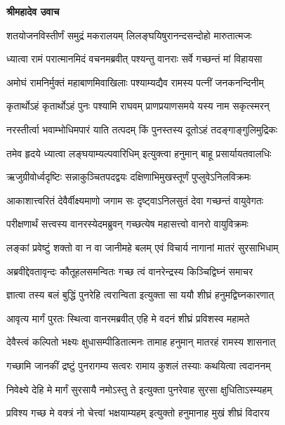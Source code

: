 




\textbf{श्रीमहादेव उवाच}

\twolineshloka
{शतयोजनविस्तीर्णं समुद्रं मकरालयम्}
{लिलङ्घयिषुरानन्दसन्दोहो मारुतात्मजः} %

\twolineshloka
{ध्यात्वा रामं परात्मानमिदं वचनमब्रवीत्}
{पश्यन्तु वानराः सर्वे गच्छन्तं मां विहायसा} %

\twolineshloka
{अमोघं रामनिर्मुक्तं महाबाणमिवाखिलाः}
{पश्याम्यद्यैव रामस्य पत्नीं जनकनन्दिनीम्} %

\twolineshloka
{कृतार्थोऽहं कृतार्थोऽहं पुनः पश्यामि राघवम्}
{प्राणप्रयाणसमये यस्य नाम सकृत्स्मरन्} %

\twolineshloka
{नरस्तीर्त्वा भवाम्भोधिमपारं याति तत्पदम्}
{किं पुनस्तस्य दूतोऽहं तदङ्गाङ्गुलिमुद्रिकः} %

\twolineshloka
{तमेव हृदये ध्यात्वा लङ्घयाम्यल्पवारिधिम्}
{इत्युक्त्वा हनुमान् बाहू प्रसार्यायतवालधिः} %

\twolineshloka
{ऋजुग्रीवोर्ध्वदृष्टिः सन्नाकुञ्चितपदद्वयः}
{दक्षिणाभिमुखस्तूर्णं पुप्लुवेऽनिलविक्रमः} %

\twolineshloka
{आकाशात्त्वरितं देवैर्वीक्ष्यमाणो जगाम सः}
{दृष्ट्वाऽनिलसुतं देवा गच्छन्तं वायुवेगतः} %

\twolineshloka
{परीक्षणार्थं सत्त्वस्य वानरस्येदमब्रुवन्}
{गच्छत्येष महासत्त्वो वानरो वायुविक्रमः} %

\twolineshloka
{लङ्कां प्रवेष्टुं शक्तो वा न वा जानीमहे बलम्}
{एवं विचार्य नागानां मातरं सुरसाभिधाम्} %

\twolineshloka
{अब्रवीद्देवतावृन्दः कौतूहलसमन्वितः}
{गच्छ त्वं वानरेन्द्रस्य किञ्चिद्विघ्नं समाचर} %

\twolineshloka
{ज्ञात्वा तस्य बलं बुद्धिं पुनरेहि त्वरान्विता}
{इत्युक्ता सा ययौ शीघ्रं हनुमद्विघ्नकारणात्} %

\twolineshloka
{आवृत्य मार्गं पुरतः स्थित्वा वानरमब्रवीत्}
{एहि मे वदनं शीघ्रं प्रविशस्व महामते} %

\twolineshloka
{देवैस्त्वं कल्पितो भक्ष्यः क्षुधासम्पीडितात्मनः}
{तामाह हनुमान् मातरहं रामस्य शासनात्} %

\twolineshloka
{गच्छामि जानकीं द्रष्टुं पुनरागम्य सत्वरः}
{रामाय कुशलं तस्याः कथयित्वा त्वदाननम्} %

\twolineshloka
{निवेक्ष्ये देहि मे मार्गं सुरसायै नमोऽस्तु ते}
{इत्युक्ता पुनरेवाह सुरसा क्षुधितािऽस्म्यहम्} %

\twolineshloka
{प्रविश्य गच्छ मे वक्त्रं नो चेत्त्वां भक्षयाम्यहम्}
{इत्युक्तो हनुमानाह मुखं शीघ्रं विदारय} %

